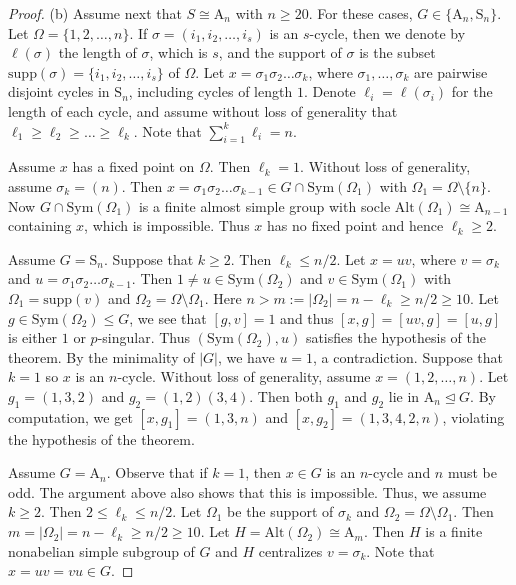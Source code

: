 \documentclass[twoside,a4paper,reqno,12pt]{amsart}
\newcommand{\<}{\langle}
\renewcommand{\>}{\rangle}
\newcommand{\leqs}{\leqslant}
\newcommand{\geqs}{\geqslant}
\newcommand{\Alt}{\mathrm {Alt}}
\newcommand{\Sym}{\mathrm {Sym}}
\newcommand{\SSS}{\mathrm {S}}
\newcommand{\AAA}{\mathrm {A}}
\newcommand{\supp}{\mathrm {supp}}
\renewcommand{\leq}{\leqs}
\renewcommand{\geq}{\geqs}
\renewcommand{\:}{\colon}
\theoremstyle{definition}
\begin{document}
\begin{proof}
(b) Assume next that $S\cong \AAA_n$ with $n\ge 20.$ For these cases, $G\in \{\AAA_n,\SSS_n\}.$ Let $\Omega=\{1,2,\ldots, n\}$. If $\sigma=(i_1,i_2,\dots,i_s)$ is an $s$-cycle, then we denote by $\ell(\sigma)$ the length of $\sigma$, which is $s$, and the support of $\sigma$ is the subset $\supp(\sigma)=\{i_1,i_2,\ldots,i_s\}$ of $\Omega.$ Let $x=\sigma_1\sigma_2\dots\sigma_k$, where $\sigma_1, \dots,\sigma_k$ are pairwise disjoint  cycles in $\SSS_n$, including cycles of length $1$. Denote $\ell_i=\ell(\sigma_i)$ for the length of each cycle, and assume without loss of generality that  $\ell_1\geq \ell_2\geq\dots\geq \ell_k.$ Note that $\sum_{i=1}^k \ell_i=n.$

Assume $x$ has a fixed point on $\Omega$. Then $\ell_k=1$. Without loss of generality, assume $\sigma_k=(n)$. Then $x=\sigma_1\sigma_2\dots\sigma_{k-1}\in G\cap \Sym(\Omega_1)$ with $\Omega_1=\Omega\setminus \{n\}$. Now $G\cap \Sym(\Omega_1)$ is a finite almost simple group with socle $\Alt(\Omega_1)\cong \AAA_{n-1}$ containing $x$, which is impossible.  Thus  $x$ has no fixed point and hence $\ell_k\ge 2.$ 




Assume  $G=\SSS_n$. Suppose that $k\ge 2.$ Then $\ell_k\leq n/2$. Let $x=uv$, where $v=\sigma_k$ and $u=\sigma_1\sigma_2\dots \sigma_{k-1}$. Then $1\neq u\in\Sym(\Omega_2)$ and $v\in\Sym(\Omega_1)$ with $\Omega_1=\supp(v)$ and $\Omega_2=\Omega\setminus \Omega_1.$  Here $n>m:=|\Omega_2|=n-\ell_k\ge n/2\ge 10$. Let $g\in\Sym(\Omega_2)\leq G$, we see that $[g,v]=1$ and thus $[x,g]=[uv,g]=[u,g]$ is either $1$ or $p$-singular. Thus $(\Sym(\Omega_2),u)$ satisfies the hypothesis of the theorem. By the minimality of $|G|$, we have $u=1$,  a contradiction. Suppose that $k=1$ so $x$ is an $n$-cycle. Without loss of generality, assume $x=(1,2,\dots,n)$. Let $g_1=(1,3,2)$ and $g_2=(1,2)(3,4)$. Then both $g_1$ and $g_2$ lie in $\AAA_n\unlhd G$. By computation, we get $[x,g_1]=(1,3,n)$ and $[x,g_2]=(1,3,4,2,n)$, violating the hypothesis of the theorem.

Assume $G=\AAA_n.$ Observe that if $k=1$, then $x\in G$ is an $n$-cycle and $n$ must be odd. The argument above also shows that this is impossible. Thus, we assume $k\ge 2.$  Then $2\leq \ell_k\leq n/2$. Let $\Omega_1$ be the support of $\sigma_k$ and $\Omega_2=\Omega\setminus\Omega_1$. Then $m=|\Omega_2|=n-\ell_k\ge  n/2 \ge 10.$ Let $H=\Alt(\Omega_2)\cong \AAA_m$. Then $H$ is a finite nonabelian simple subgroup of $G$ and $H$ centralizes $v=\sigma_k$. Note that $x=uv=vu\in G.$


\end{proof}
\end{document}
